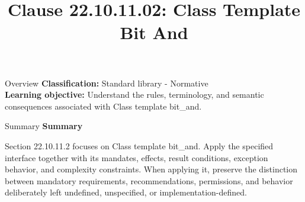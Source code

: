 \documentclass[10pt,letterpaper]{article}
\title{Clause 22.10.11.02: Class Template Bit And}
\author{}
\date{}
\begin{document}
\maketitle
\begin{CornellOverviewBox}{Overview}
\textbf{Classification:} Standard library - Normative\\[2pt]
\textbf{Learning objective:} Understand the rules, terminology, and semantic consequences associated with Class template bit\_and.
\end{CornellOverviewBox}\begin{CornellSummaryBox}{Summary}
{\sffamily\bfseries\color{Accent} Summary}\par\vspace{3pt}Section 22.10.11.2 focuses on Class template bit\_and. Apply the specified interface together with its mandates, effects, result conditions, exception behavior, and complexity constraints. When applying it, preserve the distinction between mandatory requirements, recommendations, permissions, and behavior deliberately left undefined, unspecified, or implementation-defined.
\end{CornellSummaryBox}
\end{document}
